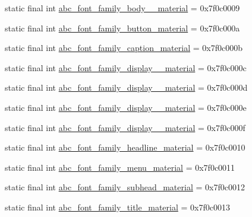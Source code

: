 \begin{DoxyCompactItemize}
\item 
static final int \mbox{\hyperlink{classandroid_1_1support_1_1design_1_1_r_1_1string_a6a320c8254930193f6f5b4cca0884be9}{abc\+\_\+font\+\_\+family\+\_\+body\+\_\+\_\+material}} = 0x7f0c0009
\item 
static final int \mbox{\hyperlink{classandroid_1_1support_1_1design_1_1_r_1_1string_a6fc5045e2023471f6c7a464f3b7cf4fb}{abc\+\_\+font\+\_\+family\+\_\+button\+\_\+material}} = 0x7f0c000a
\item 
static final int \mbox{\hyperlink{classandroid_1_1support_1_1design_1_1_r_1_1string_af36391cb3353b503b81fb1fe1bc19dab}{abc\+\_\+font\+\_\+family\+\_\+caption\+\_\+material}} = 0x7f0c000b
\item 
static final int \mbox{\hyperlink{classandroid_1_1support_1_1design_1_1_r_1_1string_af9f636ee17ea29f83a82be8362651271}{abc\+\_\+font\+\_\+family\+\_\+display\+\_\+\_\+material}} = 0x7f0c000c
\item 
static final int \mbox{\hyperlink{classandroid_1_1support_1_1design_1_1_r_1_1string_a413e8fb711210f85e1b8964ab697c716}{abc\+\_\+font\+\_\+family\+\_\+display\+\_\+\_\+material}} = 0x7f0c000d
\item 
static final int \mbox{\hyperlink{classandroid_1_1support_1_1design_1_1_r_1_1string_a99a27d2339861258cb4b6bd9026717c6}{abc\+\_\+font\+\_\+family\+\_\+display\+\_\+\_\+material}} = 0x7f0c000e
\item 
static final int \mbox{\hyperlink{classandroid_1_1support_1_1design_1_1_r_1_1string_a76f7b5add4d6a8d9813b0ca11766dad5}{abc\+\_\+font\+\_\+family\+\_\+display\+\_\+\_\+material}} = 0x7f0c000f
\item 
static final int \mbox{\hyperlink{classandroid_1_1support_1_1design_1_1_r_1_1string_a4f7d547c5ab28f983d3a4937d9dd6367}{abc\+\_\+font\+\_\+family\+\_\+headline\+\_\+material}} = 0x7f0c0010
\item 
static final int \mbox{\hyperlink{classandroid_1_1support_1_1design_1_1_r_1_1string_a5456366ce00ccce19f6810ff5d297775}{abc\+\_\+font\+\_\+family\+\_\+menu\+\_\+material}} = 0x7f0c0011
\item 
static final int \mbox{\hyperlink{classandroid_1_1support_1_1design_1_1_r_1_1string_aeab04c3458d19988f42b071928374749}{abc\+\_\+font\+\_\+family\+\_\+subhead\+\_\+material}} = 0x7f0c0012
\item 
static final int \mbox{\hyperlink{classandroid_1_1support_1_1design_1_1_r_1_1string_ae1a3235a15930a23d4e8915dba083812}{abc\+\_\+font\+\_\+family\+\_\+title\+\_\+material}} = 0x7f0c0013

\end{DoxyCompactItemize}

